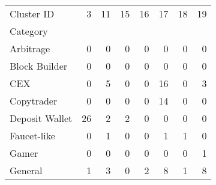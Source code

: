 \begin{tabular}{lrrrrrrr}
\toprule
Cluster ID &  3  &  11 &  15 &  16 &  17 &  18 &  19 \\
Category       &     &     &     &     &     &     &     \\
\midrule
Arbitrage      &   0 &   0 &   0 &   0 &   0 &   0 &   0 \\
Block Builder  &   0 &   0 &   0 &   0 &   0 &   0 &   0 \\
CEX            &   0 &   5 &   0 &   0 &  16 &   0 &   3 \\
Copytrader     &   0 &   0 &   0 &   0 &  14 &   0 &   0 \\
Deposit Wallet &  26 &   2 &   2 &   0 &   0 &   0 &   0 \\
Faucet-like    &   0 &   1 &   0 &   0 &   1 &   1 &   0 \\
Gamer          &   0 &   0 &   0 &   0 &   0 &   0 &   1 \\
General        &   1 &   3 &   0 &   2 &   8 &   1 &   8 \\
\bottomrule
\end{tabular}
